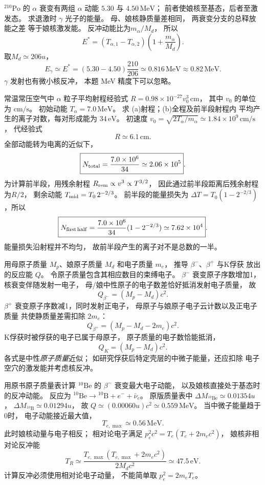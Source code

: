 $\mathrm{^{210}Po}$ 的 $\alpha$ 衰变有两组
$\alpha$ 动能 $5.30$ 与 $4.50\,\mathrm{MeV}$；
前者使娘核至基态，后者至激发态。
求退激时 $\gamma$ 光子的能量。
\exsolution
母、娘核静质量差相同，
两衰变分支的总释放能之差
等于娘核激发能。
反冲动能比为$m_\alpha/M_d$，
所以
\[
 E^*=(T_{\alpha,1}-T_{\alpha,2})
 \left(1+\frac{m_\alpha}{M_d}\right).
\]
取$M_d\simeq206u$，
\[
 \boxed{E_\gamma\simeq E^*
 =(5.30-4.50)\frac{210}{206}
 \simeq0.816\,\mathrm{MeV}\approx0.82\,\mathrm{MeV}}.
\]
\excheck $\gamma$ 发射也有微小核反冲，
本题 MeV 精度下可以忽略。

常温常压空气中 $\alpha$ 粒子平均射程经验式
$R=0.98\times10^{-27}v_0^3\,\mathrm{cm}$，
其中 $v_0$ 的单位为 $\mathrm{cm/s}$。
初始动能 $T_\alpha=7.0\,\mathrm{MeV}$。
求 (a)射程；(b)全程及前半段射程内
平均产生的离子对数，每对形成能为 $34\,\mathrm{eV}$。
\exsolution
初速度
$v_0=\sqrt{2T_\alpha/m_\alpha}
\simeq1.84\times10^9\,\mathrm{cm/s}$，
代经验式
\[
 \boxed{R\simeq6.1\,\mathrm{cm}}.
\]
全部动能转为电离的近似下，
\[
 \boxed{N_{\rm total}=\frac{7.0\times10^6}{34}
 \simeq2.06\times10^5}.
\]
为计算前半段，用残余射程
$R_{\rm rem}\propto v^3\propto T^{3/2}$，
因此通过前半段距离后残余射程为$R/2$，
剩余动能
$T_{\rm mid}=T_0\,2^{-2/3}$。
前半段的能量损失为
$\Delta T=T_0(1-2^{-2/3})$，所以
\[
 \boxed{N_{\rm first\,half}=
 \frac{7.0\times10^6}{34}(1-2^{-2/3})
 \simeq7.62\times10^4}.
\]
\excheck 能量损失沿射程并不均匀，
故前半段产生的离子对不是总数的一半。

用母原子质量 $M_p$、娘原子质量 $M_d$
和电子质量 $m_e$，
推导 $\beta^-$、$\beta^+$ 与K俘获
放出的反应能 $Q$。
\exsolution
令原子质量包含其相应数目的束缚电子。
$\beta^-$ 衰变原子序数增加1，
核衰变伴随发射一电子，
母/娘中性原子的电子数差恰好抵消发射电子质量，
故
\[
 \boxed{Q_{\beta^-}=(M_p-M_d)c^2}.
\]
$\beta^+$ 衰变原子序数减1，同时发射正电子，
母原子与娘原子电子云计数以及正电子质量
共使静质量差需扣除 $2m_e$：
\[
 \boxed{Q_{\beta^+}=(M_p-M_d-2m_e)c^2}.
\]
K俘获时被俘获的电子已属于母原子，
原子质量的电子数恰能抵消，
\[
 \boxed{Q_{K}=(M_p-M_d)c^2}.
\]
\excheck 各式是中性\emph{原子质量}近似；
如研究俘获后特定壳层的中微子能量，还应扣除
电子空穴的激发能并考虑核反冲。

用原书原子质量表计算
$\mathrm{^{10}Be}$ 的 $\beta^-$ 衰变最大电子动能，
以及娘核直接处于基态时的反冲动能。
\exsolution
反应为
$\mathrm{^{10}Be}\to\mathrm{^{10}B}+e^-+\bar\nu_e$。
原版质量表中
$\Delta M_{\mathrm{^{10}Be}}\simeq0.01354u$，
$\Delta M_{\mathrm{^{10}B}}\simeq0.01294u$，
故
$Q\simeq(0.00060u)c^2\simeq0.559\,\mathrm{MeV}$。
当中微子能量趋于0时，
电子动能接近最大值，
\[
 \boxed{T_{e,\max}\simeq0.56\,\mathrm{MeV}}.
\]
此时娘核动量与电子相反；
相对论电子满足
$p_e^2c^2=T_e(T_e+2m_ec^2)$，
娘核非相对论反冲能
\[
 \boxed{T_R\simeq
 \frac{T_{e,\max}(T_{e,\max}+2m_ec^2)}
 {2M_dc^2}\simeq47.5\,\mathrm{eV}}.
\]
\excheck 计算反冲必须使用相对论电子动量，
不能简单取 $p_e^2=2m_eT_e$。

